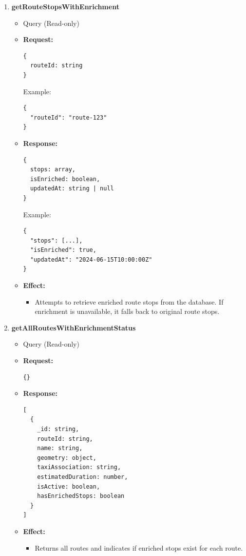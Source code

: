 \documentclass[a4paper,12pt]{article}
\begin{document}
\begin{enumerate}
  \item \textbf{getRouteStopsWithEnrichment}
    \begin{itemize}
      \item Query (Read-only)
      \item \textbf{Request:}
      \begin{verbatim}
{
  routeId: string
}
      \end{verbatim}
      Example:
      \begin{verbatim}
{
  "routeId": "route-123"
}
      \end{verbatim}
      \item \textbf{Response:}
      \begin{verbatim}
{
  stops: array,
  isEnriched: boolean,
  updatedAt: string | null
}
      \end{verbatim}
      Example:
      \begin{verbatim}
{
  "stops": [...],
  "isEnriched": true,
  "updatedAt": "2024-06-15T10:00:00Z"
}
      \end{verbatim}
      \item \textbf{Effect:}
      \begin{itemize}
        \item Attempts to retrieve enriched route stops from the database. If enrichment is unavailable, it falls back to original route stops.
      \end{itemize}
    \end{itemize}

  \item \textbf{getAllRoutesWithEnrichmentStatus}
    \begin{itemize}
      \item Query (Read-only)
      \item \textbf{Request:}
      \begin{verbatim}
{}
      \end{verbatim}
      \item \textbf{Response:}
      \begin{verbatim}
[
  {
    _id: string,
    routeId: string,
    name: string,
    geometry: object,
    taxiAssociation: string,
    estimatedDuration: number,
    isActive: boolean,
    hasEnrichedStops: boolean
  }
]
      \end{verbatim}
      \item \textbf{Effect:}
      \begin{itemize}
        \item Returns all routes and indicates if enriched stops exist for each route.
      \end{itemize}
    \end{itemize}


\end{enumerate}
\end{document}
